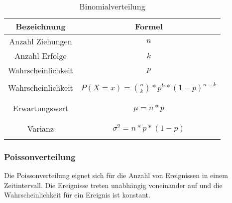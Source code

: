\documentclass[12pt]{scrartcl}
\begin{document}
\begin{table}[h]
    \begin{tabular}{ | c | c | }
        \hline
        Bezeichnung        & Formel                                      \\
        \hline
        Anzahl Ziehungen   & $n$                                         \\
        Anzahl Erfolge     & $k$                                         \\
        Wahrscheinlichkeit & $p$                                         \\
        \hline             &                                             \\
        Wahrscheinlichkeit & $P(X=x) = \binom{n}{k} * p^k * (1-p)^{n-k}$ \\&\\&\\
        Erwartungswert     & $\mu = n * p$                               \\&\\&\\
        Varianz            & $\sigma^2 = n*p*(1-p)$                      \\&\\
        \hline
    \end{tabular}
    \caption{Binomialverteilung}
\end{table}

\subsubsection{Poissonverteilung}

Die Poissonverteilung eignet sich für die Anzahl von Ereignissen in einem Zeitintervall.
Die Ereignisse treten unabhängig voneinander auf und die Wahrscheinlichkeit für ein Ereignis ist konstant.
\end{document}
